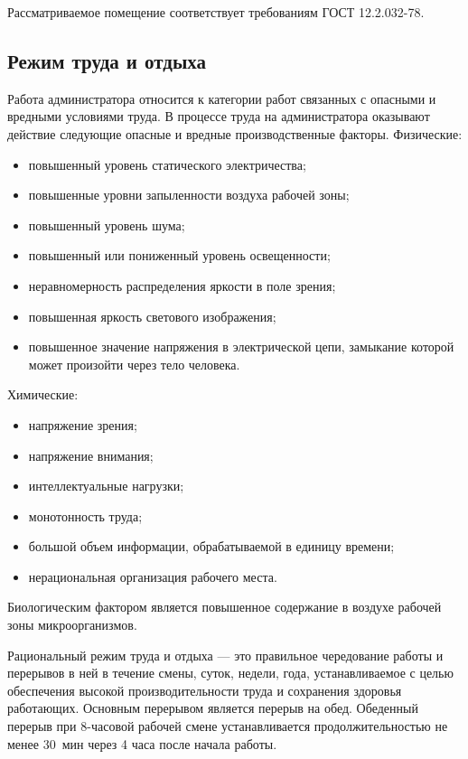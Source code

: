 Рассматриваемое помещение соответствует требованиям ГОСТ 12.2.032-78.
    	
\subsection{Режим труда и отдыха}

Работа администратора относится к категории работ связанных с опасными и вредными условиями труда.
В процессе труда на администратора оказывают действие следующие опасные и вредные производственные факторы.
Физические:
\begin{itemize}
  \item повышенный уровень статического электричества;
  \item повышенные уровни запыленности воздуха рабочей зоны;
  \item повышенный уровень шума;
  \item повышенный или пониженный уровень освещенности;
  \item неравномерность распределения яркости в поле зрения;
  \item повышенная яркость светового изображения;
  \item повышенное значение напряжения в электрической цепи, замыкание которой может произойти через тело человека.
\end{itemize}

Химические:
\begin{itemize}
  \item напряжение зрения;
  \item напряжение внимания;
  \item интеллектуальные нагрузки;
  \item монотонность труда;
  \item большой объем информации, обрабатываемой в единицу времени;
  \item нерациональная организация рабочего места.
\end{itemize}

Биологическим фактором является повышенное содержание в воздухе рабочей зоны микроорганизмов.

Рациональный режим труда и отдыха --- это правильное чередование работы и перерывов в ней в течение смены, суток, недели, года, устанавливаемое с целью обеспечения высокой производительности труда и сохранения здоровья работающих.
Основным перерывом является перерыв на обед.
Обеденный перерыв при 8-часовой рабочей смене устанавливается продолжительностью не менее 30~мин через 4 часа после начала работы.

